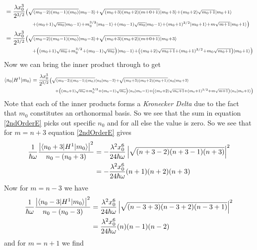 \documentclass[11pt]{article}
\numberwithin{equation}{section}
\begin{document}
\begin{enumerate}[(a)]
\begin{align*}
&= \frac{\lambda x_0^3}{2^{3/2}}\scriptstyle{\left(\sqrt{(m_0-2)(m_0-1)(m_0)}|{m_0-3}\rangle + \sqrt{(m_0+3)(m_0+2)(m+0+1)}|{m_0+3}\rangle  + (m_0+2)\sqrt{m_0+1}|{m_0+1}\rangle\right.} \\
&\ \ \ \ \ \ \ \ \ \ \ \ \ \scriptstyle{\left. + (m_0+1)\sqrt{m_0}|{m_0-1}\rangle  + m_0^{3/2}|{m_0-1}\rangle + (m_0-1)\sqrt{m_0}|{m_0-1}\rangle + (m_0+1)^{3/2}|{m_0+1}\rangle +m\sqrt{m+1}|{m_0+1}\rangle\right)}\\
&= \frac{\lambda x_0^3}{2^{3/2}}\scriptstyle{\left(\sqrt{(m_0-2)(m_0-1)(m_0)}|{m_0-3}\rangle + \sqrt{(m_0+3)(m_0+2)(m+0+1)}|{m_0+3}\rangle \right.} \\
&\ \ \ \ \ \ \ \ \ \ \ \ \ \scriptstyle{\left. + \left((m_0+1)\sqrt{m_0} + m_0^{3/2} + (m_0-1)\sqrt{m_0}\right)|{m_0-1}\rangle+ \left((m_0+2)\sqrt{m_0+1} + (m_0+1)^{3/2} +m_0\sqrt{m_0+1}\right)|{m_0+1}\rangle\right)}
\end{align*}
Now we can bring the inner product through to get
\begin{align*}
\langle{n_0}|H^1|{m_0}\rangle &=  \frac{\lambda x_0^3}{2^{3/2}}\scriptstyle{\left(\sqrt{(m_0-2)(m_0-1)(m_0)}\langle{n_0}|{m_0-3}\rangle + \sqrt{(m_0+3)(m_0+2)(m_0+1)}\langle{n_0}|{m_0+3}\rangle \right.} \\
&\ \ \ \ \ \ \ \ \ \ \ \ \ \scriptstyle{\left. + \left((m_0+1)\sqrt{m_0} + m_0^{3/2} + (m_0-1)\sqrt{m_0}\right)\langle{n_0}|{m_0-1}\rangle+ \left((m_0+2)\sqrt{m_0+1} + (m_0+1)^{3/2} +m\sqrt{m+1}\right)\langle{n_0}|{m_0+1}\rangle\right)}
\end{align*}
Note that each of the inner products forms a \emph{Kronecker Delta} due to the fact that $m_0$ constitutes an orthonormal basis. So we see that the sum in equation \ref{2ndOrderE} picks out specific $n_0$ and for all else the value is zero. So we see that for $m=n+3$ equation \ref{2ndOrderE} gives
\begin{align*}
\frac{1}{\hbar\omega}\frac{\left|\langle{n_0+3}|H^1|{m_0}\rangle\right|^2}{n_0 - (n_0+3)} &= -\frac{\lambda^2 x_0^6}{24\hbar\omega}\left|\sqrt{(n+3-2)(n+3-1)(n+3)}\right|^2\\
&= -\frac{\lambda^2 x_0^6}{24\hbar\omega}(n+1)(n+2)(n+3)
\end{align*}
Now for $m=n-3$ we have
\begin{align*}
\frac{1}{\hbar\omega}\frac{\left|\langle{n_0-3}|H^1|{m_0}\rangle\right|^2}{n_0 - (n_0-3)} &= \frac{\lambda^2 x_0^6}{24\hbar\omega}\left|\sqrt{(n-3+3)(n-3+2)(n-3+1)}\right|^2\\
&= \frac{\lambda^2 x_0^6}{24\hbar\omega}(n)(n-1)(n-2)
\end{align*}
and for $m = n+1$ we find
\begin{align*}

\end{align*}
\end{enumerate}
\end{document}
